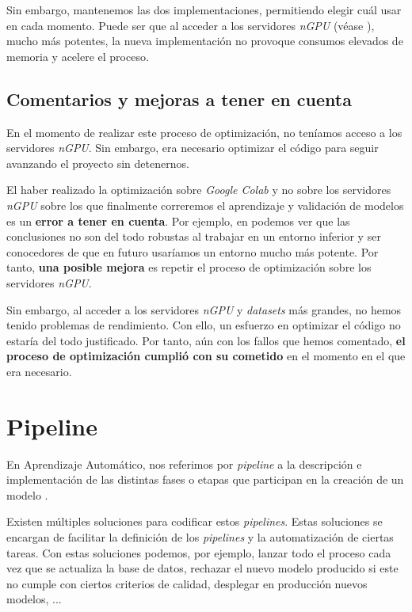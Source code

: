 Sin embargo, mantenemos las dos implementaciones, permitiendo elegir cuál usar en cada momento. Puede ser que al acceder a los servidores \textit{nGPU} (véase ), mucho más potentes, la nueva implementación no provoque consumos elevados de memoria y acelere el proceso.

\subsection{Comentarios y mejoras a tener en cuenta}

En el momento de realizar este proceso de optimización, no teníamos acceso a los servidores \textit{nGPU}. Sin embargo, era necesario optimizar el código para seguir avanzando el proyecto sin detenernos.

El haber realizado la optimización sobre \textit{Google Colab} y no sobre los servidores \textit{nGPU} sobre los que finalmente correremos el aprendizaje y validación de modelos es un \textbf{error a tener en cuenta}. Por ejemplo, en  podemos ver que las conclusiones no son del todo robustas al trabajar en un entorno inferior y ser conocedores de que en futuro usaríamos un entorno mucho más potente. Por tanto, \textbf{una posible mejora} es repetir el proceso de optimización sobre los servidores \textit{nGPU}.

Sin embargo, al acceder a los servidores \textit{nGPU} y \textit{datasets} más grandes, no hemos tenido problemas de rendimiento. Con ello, un esfuerzo en optimizar el código no estaría del todo justificado. Por tanto, aún con los fallos que hemos comentado, \textbf{el proceso de optimización cumplió con su cometido} en el momento en el que era necesario.

\section{Pipeline} \label{isec:pipeline}

En Aprendizaje Automático, nos referimos por \textit{pipeline} a la descripción e implementación de las distintas fases o etapas que participan en la creación de un modelo \cite{informatica:pipeline_web}.

Existen múltiples soluciones para codificar estos \textit{pipelines}. Estas soluciones se encargan de facilitar la definición de los \textit{pipelines} y la automatización de ciertas tareas. Con estas soluciones podemos, por ejemplo, lanzar todo el proceso cada vez que se actualiza la base de datos, rechazar el nuevo modelo producido si este no cumple con ciertos criterios de calidad, desplegar en producción nuevos modelos, ...

